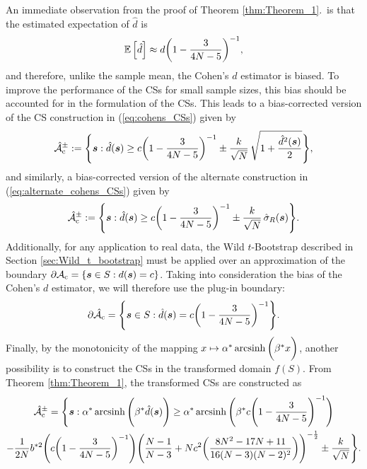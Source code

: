 An immediate observation from the proof of Theorem \ref{thm:Theorem_1}.\ is that the estimated expectation of $\hat{d}$ is 
\begin{equation}
\label{eq:estimated_expection_of_d_hat}
\operatorname*{\mathbb{E}}\Big[\hat{d}\Big] \approx d \bigg(1 - \frac{3}{4N - 5}\bigg)^{-1},
\end{equation}
and therefore, unlike the sample mean, the Cohen's $d$ estimator is biased. To improve the performance of the CSs for small sample sizes, this bias should be accounted for in the formulation of the CSs. This leads to a bias-corrected version of the CS construction in (\ref{eq:cohens_CSs}) given by 
\begin{equation}
\label{eq:bias_corrected_cohens_CSs}
\operatorname{\hat{\mathcal{A}}_{c}^\pm} := \Bigg\{\bm{s} : \hat{d}(\bm{s}) \geq c\bigg(1 - \frac{3}{4N - 5}\bigg)^{-1} \pm \frac{k}{{\sqrt{N}}}\, \sqrt{1 + \frac{\hat{d}^{2}({\bm{s}})}{2}}\Bigg\}, 
\end{equation}
and similarly, a bias-corrected version of the alternate construction in (\ref{eq:alternate_cohens_CSs}) given by
\begin{equation}
\label{eq:bias_corrected_alternate_cohens_CSs}
\operatorname{\hat{\mathcal{A}}_{c}^\pm} := \Bigg\{\bm{s} : \hat{d}(\bm{s}) \geq c\bigg(1 - \frac{3}{4N - 5}\bigg)^{-1} \pm \frac{k}{\sqrt{N}}\, \hat{\sigma}_{R}(\bm{s}) \Bigg\}.
\end{equation}
Additionally, for any application to real data, the Wild $t$-Bootstrap described in Section \ref{sec:Wild_t_bootstrap} must be applied over an approximation of the boundary $\operatorname{\partial\mathcal{A}_{c}} = \{\bm{s} \in S : d(\bm{s}) = c \}$. Taking into consideration the bias of the Cohen's $d$ estimator, we will therefore use the plug-in boundary:
\begin{equation}
\label{eq:plug_in_boundary}
\operatorname{\partial\hat{\mathcal{A}}_{c}} = \Bigg\{\bm{s} \in S : \hat{d}(\bm{s}) = c\bigg(1 - \frac{3}{4N - 5}\bigg)^{-1} \Bigg\}.
\end{equation}
Finally, by the monotonicity of the mapping $x \mapsto \alpha^{*} \operatorname{arcsinh}\bigg({\beta^{*} x}\bigg)$, another possibility is to construct the CSs in the transformed domain $f(S)$. From Theorem \ref{thm:Theorem_1}, the transformed CSs are constructed as
\begin{multline}
\label{eq:transformed_cohens_CSs}
    \operatorname{\hat{\mathcal{A}}_{c}^\pm} = \Bigg\{\bm{s} : \alpha^{*} \operatorname{arcsinh}\Bigg(\beta^{*} \hat{d}(\bm{s}) \Bigg) \geq \alpha^{*} \operatorname{arcsinh}\Bigg(\beta^{*} c \Bigg(1 - \frac{3}{4N -5}\Bigg)^{-1} \Bigg) \\
    - \frac{1}{2N}b^{*2}\Bigg(c \bigg(1 - \frac{3}{4N - 5}\bigg)^{-1} \Bigg)\Bigg(\frac{N-1}{N-3} + N c^{2} \bigg(\frac{8N^{2} - 17N + 11}{16(N-3)(N-2)^{2}} \bigg)\Bigg)^{-\frac{1}{2}} \pm \frac{k}{\sqrt{N}} \Bigg\}. 
\end{multline}
